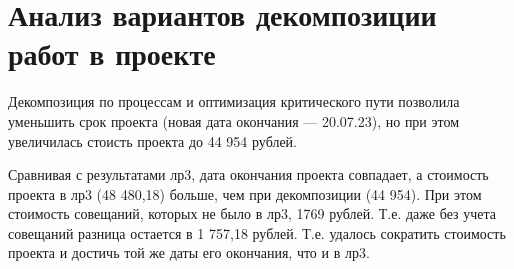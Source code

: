 \clearpage
\section{Анализ вариантов декомпозиции работ в проекте}

Декомпозиция по процессам и оптимизация критического пути позволила уменьшить срок проекта (новая дата окончания --- 20.07.23), 
но при этом увеличилась стоисть проекта до 44 954 рублей. 



\newpage
Сравнивая с результатами лр3, дата окончания проекта совпадает, а стоимость проекта в лр3 (48 480,18) больше, чем при декомпозиции (44 954).
При этом стоимость совещаний, которых не было в лр3, 1769 рублей. Т.е. даже без учета совещаний разница остается в 1 757,18 рублей. Т.е. удалось сократить стоимость проекта 
и достичь той же даты его окончания, что и в лр3.










